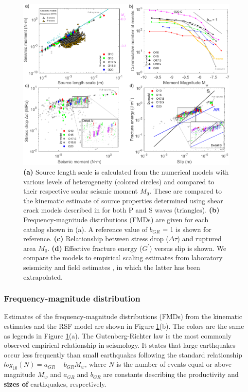 \documentclass[preprint,1p, 10pt,authoryear]{elsarticle}
\begin{document}
\begin{figure}
	\centering
	\includegraphics[scale = 0.95]{FIG10_revised.pdf} 
	\caption{\textbf{(a)} Source length scale is calculated from the numerical models with various levels of heterogeneity (colored circles) and compared to their respective scalar seismic moment $M_{0}$. These are compared to the kinematic estimate of source properties determined using shear crack models described in \citet{Selvadurai2019} for both P and S waves (triangles). \textbf{(b)} Frequency-magnitude distributions (FMDs) are given for each catalog shown in (a). A reference value of  $b_{GR}$ = 1 is shown for reference. \textbf{(c)} Relationship between stress drop ($\Delta\tau$) and ruptured area $M_{0}$. \textbf{(d)} Effective fracture energy ($G^{'}$) versus slip is shown. We compare the models to empirical scaling estimates from laboratory seismicity \citep[black line,][]{Selvadurai2019} and field estimates \citep[blue line][]{Abercrombie2005}, in which the latter has been extrapolated.}
	\label{fig10}
\end{figure}

\subsubsection{Frequency-magnitude distribution}
Estimates of the frequency-magnitude distributions (FMDs) from the kinematic estimates and the RSF model are shown in Figure \ref{fig10}(b). The colors are the same as legends in Figure \ref{fig10}(a).  The Gutenberg-Richter \citep{Gutenberg1944} law is the most commonly observed empirical relationship in seismology.  It states that large earthquakes occur less frequently than small earthquakes following the standard relationship $log_{10}(N)= a_{GR} - b_{GR}M_{w}$, where $N$ is the number of events equal or above magnitude $M_{w}$ and $a_{GR}$ and $b_{GR}$ are constants describing the productivity and\textbf{ sizes of }earthquakes, respectively\cite[e.g.][]{Wiemer2002}.  
\end{document}
